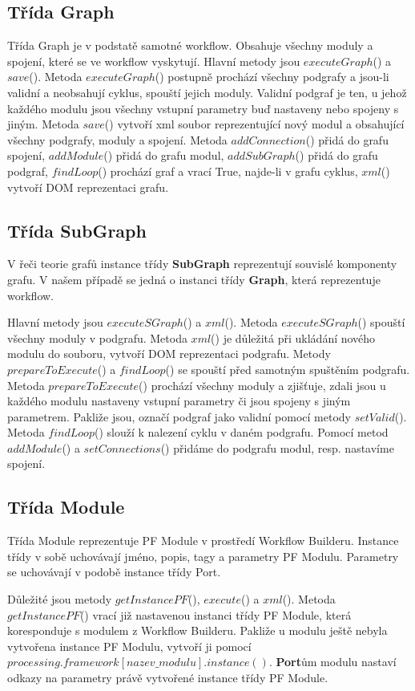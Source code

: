\newpage
\subsection*{Třída Graph}
Třída Graph je v podstatě samotné workflow. Obsahuje všechny moduly a
spojení, které se ve workflow vyskytují. Hlavní metody jsou
$executeGraph$() a $save$(). Metoda $executeGraph$() postupně prochází
všechny podgrafy a jsou-li validní a neobsahují cyklus, spouští jejich
moduly. Validní podgraf je ten, u jehož každého modulu jsou všechny
vstupní parametry buď nastaveny nebo spojeny s jiným. Metoda $save$()
vytvoří xml soubor reprezentující nový modul a obsahující všechny
podgrafy, moduly a spojení. Metoda $addConnection$() přidá do grafu
spojení, $addModule$() přidá do grafu modul, $addSubGraph$() přidá do
grafu podgraf, $findLoop$() prochází graf a vrací True, najde-li v
grafu cyklus, $xml$() vytvoří DOM reprezentaci grafu.

\subsection*{Třída SubGraph}
V řeči teorie grafů instance třídy \textbf{SubGraph} reprezentují
souvislé komponenty grafu. V našem případě se jedná o instanci
třídy \textbf{Graph}, která reprezentuje workflow.

Hlavní metody jsou $executeSGraph$() a $xml$(). Metoda
$executeSGraph$() spouští všechny moduly v podgrafu. Metoda $xml$() je
důležitá při ukládání nového modulu do souboru, vytvoří DOM
reprezentaci podgrafu. Metody $prepareToExecute$() a $findLoop$() se
spouští před samotným spuštěním podgrafu. Metoda $prepareToExecute$()
prochází všechny moduly a zjišťuje, zdali jsou u každého modulu
nastaveny vstupní parametry či jsou spojeny s jiným
parametrem. Pakliže jsou, označí podgraf jako validní pomocí metody
$setValid$(). Metoda $findLoop$() slouží k nalezení cyklu v daném
podgrafu.
Pomocí metod $addModule$() a $setConnections$() přidáme do podgrafu modul, resp. nastavíme spojení.

\subsection*{Třída Module}
Třída Module reprezentuje PF Module v prostředí Workflow
Builderu. Instance třídy v sobě uchovávají jméno, popis, tagy a
parametry PF Modulu. Parametry se uchovávají v podobě instance třídy
Port.

Důležité jsou metody $getInstancePF$(), $execute$() a $xml$(). Metoda
$getInstancePF$() vrací již nastavenou instanci třídy PF Module, která
koresponduje s modulem z Workflow Builderu. Pakliže u modulu ještě
nebyla vytvořena instance PF Modulu, vytvoří ji pomocí
$processing.framework[nazev\_modulu].instance()$. \textbf{Port}ům
modulu nastaví odkazy na parametry právě vytvořené instance třídy PF
Module.

